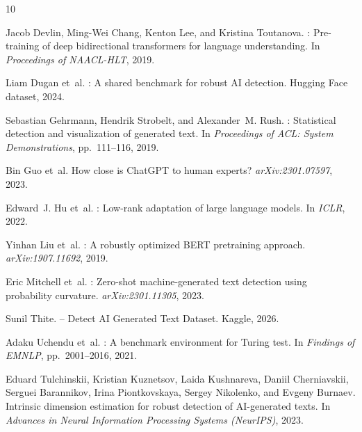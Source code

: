 \documentclass{article}
\begin{document}
\newpage
\begin{thebibliography}{10}

    Jacob Devlin, Ming-Wei Chang, Kenton Lee, and Kristina Toutanova.
    : Pre-training of deep bidirectional transformers for language understanding.
    \newblock In \emph{Proceedings of NAACL-HLT}, 2019.

    Liam Dugan et~al.
    : A shared benchmark for robust {AI} detection.
    \newblock Hugging Face dataset, 2024.

    Sebastian Gehrmann, Hendrik Strobelt, and Alexander~M. Rush.
    : Statistical detection and visualization of generated text.
    \newblock In \emph{Proceedings of ACL: System Demonstrations}, pp.\ 111--116, 2019.

    Bin Guo et~al.
    \newblock How close is {ChatGPT} to human experts?
    \newblock \emph{arXiv:2301.07597}, 2023.

    Edward~J. Hu et~al.
    : Low-rank adaptation of large language models.
    \newblock In \emph{ICLR}, 2022.

    Yinhan Liu et~al.
    : A robustly optimized {BERT} pretraining approach.
    \newblock \emph{arXiv:1907.11692}, 2019.

    Eric Mitchell et~al.
    : Zero-shot machine-generated text detection using probability curvature.
    \newblock \emph{arXiv:2301.11305}, 2023.

    Sunil Thite.
     -- Detect {AI} Generated Text Dataset.
    \newblock Kaggle, 2026.

    Adaku Uchendu et~al.
    : A benchmark environment for {T}uring test.
    \newblock In \emph{Findings of EMNLP}, pp.\ 2001--2016, 2021.

    Eduard Tulchinskii, Kristian Kuznetsov, Laida Kushnareva, Daniil Cherniavskii,
    Serguei Barannikov, Irina Piontkovskaya, Sergey Nikolenko, and Evgeny Burnaev.
    \newblock Intrinsic dimension estimation for robust detection of {AI}-generated texts.
    \newblock In \emph{Advances in Neural Information Processing Systems (NeurIPS)}, 2023.

\end{thebibliography}

\end{document}
